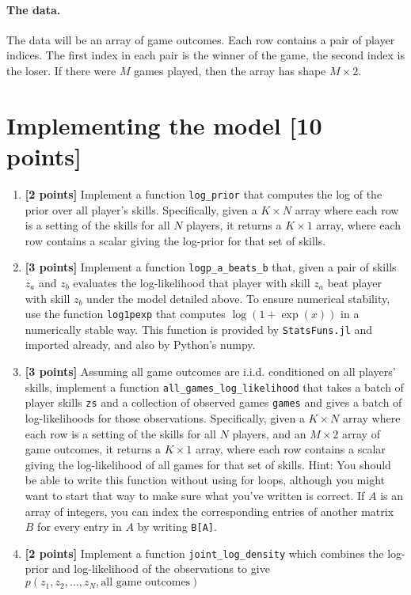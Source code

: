 \documentclass{article}
\begin{document}
\paragraph{The data.}
The data will be an array of game outcomes.
Each row contains a pair of player indices.
The first index in each pair is the winner of the game, the second index is the loser.
If there were $M$ games played, then the array has shape $M \times 2$.

\pagebreak
\section{Implementing the model [10 points]}
\begin{enumerate}[label=(\alph*)]
	\item {\bf [2 points]} Implement a function \texttt{log\_prior} that computes the log of the prior over all player's skills.
  Specifically, given a $K \times N$ array where each row is a setting of the skills for all $N$ players, it returns a $K \times 1$ array, where each row contains a scalar giving the log-prior for that set of skills.
  \item {\bf [3 points]} Implement a function \texttt{logp\_a\_beats\_b} that, given a pair of skills $z_a$ and $z_b$
    evaluates the log-likelihood that player with skill $z_a$ beat player with skill $z_b$ under the model detailed above.
    To ensure numerical stability, use the function  \texttt{log1pexp} that computes $\log(1 + \exp(x))$ in a numerically stable way.
    This function is provided by \texttt{StatsFuns.jl} and imported already, and also by Python's numpy.
  \item {\bf [3 points]} Assuming all game outcomes are i.i.d. conditioned on all players' skills, implement a function \texttt{all\_games\_log\_likelihood} that takes a batch of player skills \texttt{zs} and a collection of observed games \texttt{games} and gives a batch of log-likelihoods for those observations.
  Specifically, given a $K \times N$ array where each row is a setting of the skills for all $N$ players, and an $M \times 2$ array of game outcomes, it returns a $K \times 1$ array, where each row contains a scalar giving the log-likelihood of all games for that set of skills.
  Hint: You should be able to write this function without using for loops, although you might want to start that way to make sure what you've written is correct.  If $A$ is an array of integers, you can index the corresponding entries of another matrix $B$ for every entry in $A$ by writing \texttt{B[A]}.
  \item {\bf [2 points]} Implement a function \texttt{joint\_log\_density} which combines the log-prior and log-likelihood of the observations to give $p(z_1, z_2, \dots, z_N, \text{all game outcomes})$
\end{enumerate}
\end{document}
